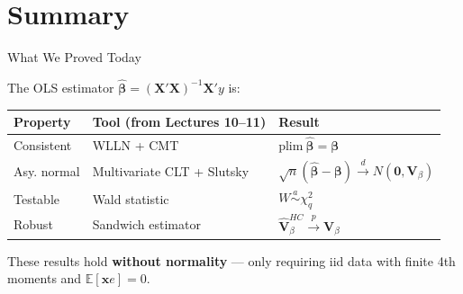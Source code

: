 \documentclass[aspectratio=169, handout, t]{beamer}
\numberwithin{equation}{section}
\begin{document}
\section{Summary}

\begin{frame}{What We Proved Today}

The OLS estimator $\hat{\bm{\beta}}=(\bm{X}'\bm{X})^{-1}\bm{X}'y$ is:

\medskip

\renewcommand{\arraystretch}{1.4}
\begin{tabular}{lll}
\toprule
\textbf{Property} & \textbf{Tool (from Lectures 10--11)} & \textbf{Result} \\
\midrule
Consistent & WLLN + CMT & $\text{plim}\ \hat{\bm{\beta}} = \bm{\beta}$ \\
Asy. normal & Multivariate CLT + Slutsky & $\sqrt{n}(\hat{\bm{\beta}} - \bm{\beta}) \overset{d}{\to} N(\bm{0}, \bm{V}_\beta)$ \\
Testable & Wald statistic & $W \overset{a}{\sim} \chi^2_q$ \\
Robust & Sandwich estimator & $\hat{\bm{V}}_\beta^{HC} \overset{p}{\to} \bm{V}_\beta$ \\
\bottomrule
\end{tabular}
\renewcommand{\arraystretch}{1.0}

\pause

\bigskip

These results hold \textbf{without normality} --- only requiring iid data with finite 4th moments and $\mathbb{E}[\bm{x}e] = 0$.

\end{frame}

\end{document}
